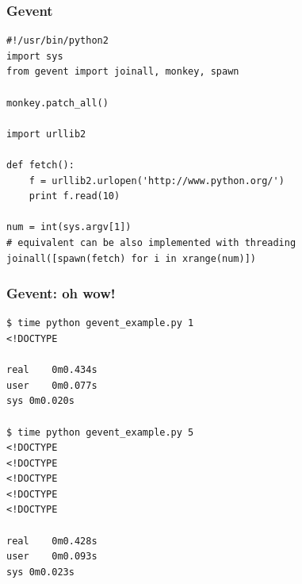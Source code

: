 \documentclass[aspectratio=169]{beamer}
\begin{document}
\begin{frame}[fragile]
  \frametitle{Gevent}
  \begin{lstlisting}
#!/usr/bin/python2
import sys
from gevent import joinall, monkey, spawn

monkey.patch_all()

import urllib2

def fetch():
    f = urllib2.urlopen('http://www.python.org/')
    print f.read(10)

num = int(sys.argv[1])
# equivalent can be also implemented with threading
joinall([spawn(fetch) for i in xrange(num)])
  \end{lstlisting}
\end{frame}


\begin{frame}[fragile]
  \frametitle{Gevent: oh wow!}
  \begin{lstlisting}
$ time python gevent_example.py 1
<!DOCTYPE 

real	0m0.434s
user	0m0.077s
sys	0m0.020s

$ time python gevent_example.py 5
<!DOCTYPE 
<!DOCTYPE 
<!DOCTYPE 
<!DOCTYPE 
<!DOCTYPE 

real	0m0.428s
user	0m0.093s
sys	0m0.023s
  \end{lstlisting}
\end{frame}
\end{document}

